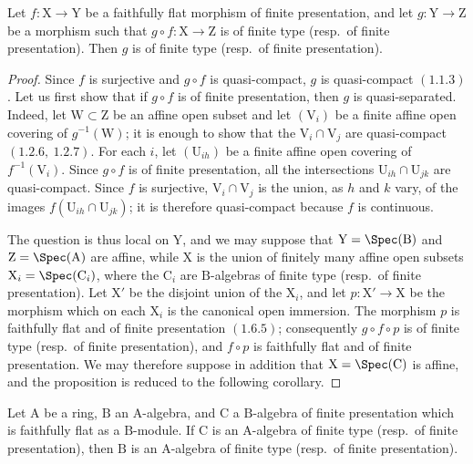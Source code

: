 \begin{proposition}[11.3.16]
\label{IV.11.3.16}
Let $f:\mathrm{X}\to\mathrm{Y}$ be a faithfully flat morphism of finite presentation, and let $g:\mathrm{Y}\to\mathrm{Z}$ be a morphism such that $g\circ f:\mathrm{X}\to\mathrm{Z}$ is of finite type (resp.\ of finite presentation). Then $g$ is of finite type (resp.\ of finite presentation).
\end{proposition}

\begin{proof}
Since $f$ is surjective and $g\circ f$ is quasi-compact, $g$ is quasi-compact $(1.1.3)$. Let us first show that if $g\circ f$ is of finite presentation, then $g$ is quasi-separated. Indeed, let $\mathrm{W}\subset\mathrm{Z}$ be an affine open subset and let $(\mathrm{V}_i)$ be a finite affine open covering of $g^{-1}(\mathrm{W})$; it is enough to show that the $\mathrm{V}_i\cap\mathrm{V}_j$ are quasi-compact $(1.2.6,\ 1.2.7)$. For each $i$, let $(\mathrm{U}_{ih})$ be a finite affine open covering of $f^{-1}(\mathrm{V}_i)$. Since $g\circ f$ is of finite presentation, all the intersections $\mathrm{U}_{ih}\cap\mathrm{U}_{jk}$ are quasi-compact. Since $f$ is surjective, $\mathrm{V}_i\cap\mathrm{V}_j$ is the union, as $h$ and $k$ vary, of the images $f(\mathrm{U}_{ih}\cap\mathrm{U}_{jk})$; it is therefore quasi-compact because $f$ is continuous.

The question is thus local on $\mathrm{Y}$, and we may suppose that $\mathrm{Y}=\Spec(\mathrm{B})$ and $\mathrm{Z}=\Spec(\mathrm{A})$ are affine, while $\mathrm{X}$ is the union of finitely many affine open subsets $\mathrm{X}_i=\Spec(\mathrm{C}_i)$, where the $\mathrm{C}_i$ are $\mathrm{B}$-algebras of finite type (resp.\ of finite presentation). Let $\mathrm{X}'$ be the disjoint union of the $\mathrm{X}_i$, and let $p:\mathrm{X}'\to\mathrm{X}$ be the morphism which on each $\mathrm{X}_i$ is the canonical open immersion. The morphism $p$ is faithfully flat and of finite presentation $(1.6.5)$; consequently $g\circ f\circ p$ is of finite type (resp.\ of finite presentation), and $f\circ p$ is faithfully flat and of finite presentation. We may therefore suppose in addition that $\mathrm{X}=\Spec(\mathrm{C})$ is affine, and the proposition is reduced to the following corollary.
\end{proof}

\begin{corollary}[11.3.17]
\label{IV.11.3.17}
Let $\mathrm{A}$ be a ring, $\mathrm{B}$ an $\mathrm{A}$-algebra, and $\mathrm{C}$ a $\mathrm{B}$-algebra of finite presentation which is faithfully flat as a $\mathrm{B}$-module. If $\mathrm{C}$ is an $\mathrm{A}$-algebra of finite type (resp.\ of finite presentation), then $\mathrm{B}$ is an $\mathrm{A}$-algebra of finite type (resp.\ of finite presentation).
\end{corollary}

